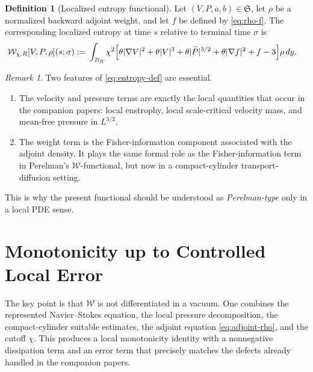 \documentclass[11pt]{amsart}
\numberwithin{equation}{section}
\theoremstyle{plain}
\theoremstyle{definition}
\newtheorem{definition}[theorem]{Definition}
\theoremstyle{remark}
\newtheorem{remark}[theorem]{Remark}
\newcommand{\Wloc}{\mathcal W}
\newcommand{\State}{\mathfrak S}
\begin{document}
\begin{definition}[Localized entropy functional]
\label{def:entropy}
Let \((V,P,a,b)\in\State\), let \(\rho\) be a normalized backward adjoint
weight, and let \(f\) be defined by \eqref{eq:rho-f}.  The corresponding
localized entropy at time \(s\) relative to terminal time \(\sigma\) is
\begin{equation}\label{eq:entropy-def}
\begin{aligned}
	\Wloc_{\chi,R}[V,P,\rho](s;\sigma)
	:= {} & \int_{B_R}\chi^2
	\Bigl[
			\theta |\nabla V|^2
		+ \theta |V|^3
		+ \theta |\widetilde P|^{3/2}
		+ \theta |\nabla f|^2
		+ f - 3
	\Bigr]\rho\,dy.
\end{aligned}
\end{equation}
\end{definition}

\begin{remark}
Two features of \eqref{eq:entropy-def} are essential.
\begin{enumerate}[label=\textup{(\arabic*)},leftmargin=2.2em]
	\item The velocity and pressure terms are exactly the local quantities that
	occur in the companion papers: local enstrophy, local scale-critical
	velocity mass, and mean-free pressure in \(L^{3/2}\).
	\item The weight term is the Fisher-information component associated with the
	adjoint density.  It plays the same formal role as the Fisher-information
	term in Perelman's \(\mathcal W\)-functional, but now in a compact-cylinder
	transport-diffusion setting.
\end{enumerate}
This is why the present functional should be understood as \emph{Perelman-type}
only in a local PDE sense.
\end{remark}

\section{Monotonicity up to Controlled Local Error}
\label{sec:monotonicity}

The key point is that \(\Wloc\) is not differentiated in a vacuum.  One
combines the represented Navier--Stokes equation, the local pressure
decomposition, the compact-cylinder suitable estimates, the adjoint equation
\eqref{eq:adjoint-rho}, and the cutoff \(\chi\).  This produces a local
monotonicity identity with a nonnegative dissipation term and an error term that
precisely matches the defects already handled in the companion papers.
\end{document}
